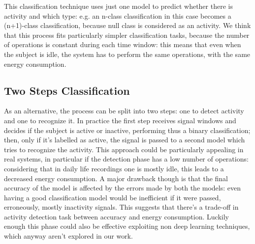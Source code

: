 This classification technique uses just one model to predict whether there is activity and which type: e.g. an n-class classification in this case becomes a (n+1)-class classification, because null class is considered as an activity. We think that this process fits particularly simpler classification tasks, because the number of operations is constant during each time window: this means that even when the subject is idle, the system has to perform the same operations, with the same energy consumption.

\subsection{Two Steps Classification}
\label{sub:twosteps}

As an alternative, the process can be split into two steps: one to detect activity and one to recognize it. In practice the first step receives signal windows and decides if the subject is active or inactive, performing thus a binary classification; then, only if it’s labelled as active, the signal is passed to a second model which tries to recognize the activity. This approach could be particularly appealing in real systems, in particular if the detection phase has a low number of operations: considering that in daily life recordings one is mostly idle, this leads to a decreased energy consumption. A major drawback though is that the final accuracy of the model is affected by the errors made by both the models: even having a good classification model would be inefficient if it were passed, erroneously, mostly inactivity signals. This suggests that there’s a trade-off in activity detection task between accuracy and energy consumption. Luckily enough this phase could also be effective exploiting non deep learning techniques, which anyway aren't explored in our work.